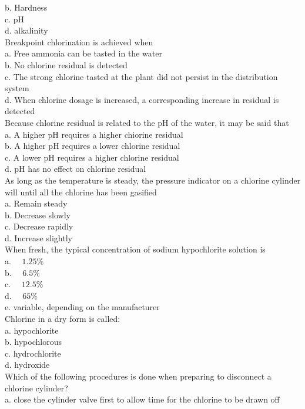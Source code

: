b. Hardness\\
c. pH\\
d. alkalinity\\
Breakpoint chlorination is achieved when\\
a. Free ammonia can be tasted in the water\\
b. No chlorine residual is detected\\
c. The strong chlorine tasted at the plant did not persist in the distribution system\\
d. When chlorine dosage is increased, a corresponding increase in residual is detected\\
Because chlorine residual is related to the $\mathrm{pH}$ of the water, it may be said that\\
a. A higher $\mathrm{pH}$ requires a higher chiorine residual\\
b. A higher $\mathrm{pH}$ requires a lower chlorine residual\\
c. A lower pH requires a higher chlorine residual\\
d. pH  has no effect on chlorine residual\\
  As long as the temperature is steady, the pressure indicator on a chlorine cylinder will until all the chlorine has been gasified\\
a. Remain steady\\
b. Decrease slowly\\
c. Decrease rapidly\\
d. Increase slightly\\
When fresh, the typical concentration of sodium hypochlorite solution is\\
a. $\quad 1.25 \%$\\
b. $\quad 6.5 \%$\\
c. $\quad 12.5 \%$\\
d. $\quad 65 \%$\\
e. variable, depending on the manufacturer\\
Chlorine in a dry form is called:\\
a.	hypochlorite\\
b.	hypochlorous\\
c.	hydrochlorite\\
d.	hydroxide\\
Which of the following procedures is done when preparing to disconnect a chlorine cylinder?\\
a.	close the cylinder valve first to allow time for the chlorine to be drawn off\\
